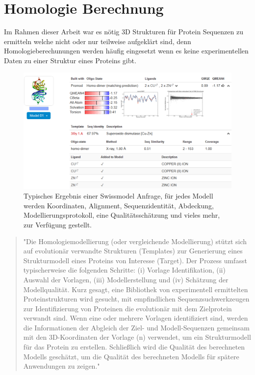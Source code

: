 \section{Homologie Berechnung}
\label{sec:siwssmodel}
Im Rahmen dieser Arbeit war es nötig 3D Strukturen für Protein Sequenzen zu ermitteln welche nicht oder nur teilweise aufgeklärt sind, denn Homologieberechunungen werden häufig eingesetzt wenn es keine experimentellen Daten zu einer Struktur eines Proteins gibt. 
\begin{figure}
    \includegraphics[width=.95\textwidth]{images/Swissmodel.png}
    \caption{Typisches Ergebnis einer Swissmodel Anfrage, für jedes Modell werden Koordinaten, Alignment, Sequenzidentität, Abdeckung, Modellierungsprotokoll, eine Qualitätsschätzung und vieles mehr, zur Verfügung gestellt.}
    \label{fig:swissmodel}
\end{figure}

\begin{quote}
    "Die Homologiemodellierung (oder vergleichende Modellierung) stützt sich auf evolutionär verwandte Strukturen (Templates) zur Generierung eines Strukturmodell eines Proteins von Interesse (Target). Der Prozess umfasst typischerweise die folgenden Schritte: (i) Vorlage Identifikation, (ii) Auswahl der Vorlagen, (iii) Modellerstellung und (iv) Schätzung der Modellqualität. Kurz gesagt, eine Bibliothek von experimentell ermittelten Proteinstrukturen wird gesucht, mit empfindlichen Sequenzsuchwerkzeugen zur Identifizierung von Proteinen die evolutionär mit dem Zielprotein verwandt sind. Wenn eine oder mehrere Vorlagen identifiziert sind, werden die Informationen der Abgleich der Ziel- und Modell-Sequenzen gemeinsam mit den 3D-Koordinaten der Vorlage (n) verwendet, um ein Strukturmodell für das Protein zu erstellen. Schließlich wird die Qualität des berechneten Modells geschätzt, um die Qualität des berechneten Modells für spätere Anwendungen zu zeigen."
\end{quote}

